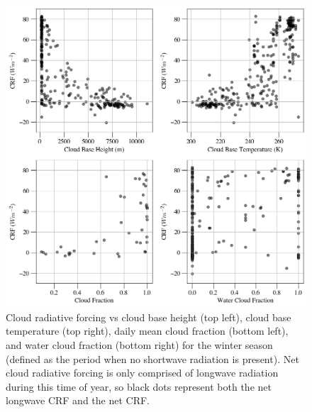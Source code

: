 \begin{figure}[p]
    \centering
    \includegraphics[width=1\linewidth]{figures/chapter4/VSWinter.png}
    \caption[Cloud radiative forcing vs cloud base height, cloud base temperature, cloud fraction, and water cloud fraction for winter.]{Cloud radiative forcing vs cloud base height (top left), cloud base temperature (top right), daily mean cloud fraction (bottom left), and water cloud fraction (bottom right) for the winter season (defined as the period when no shortwave radiation is present). Net cloud radiative forcing is only comprised of longwave radiation during this time of year, so black dots represent both the net longwave CRF and the net CRF.}
    \label{fig:winter:crf}
\end{figure}

